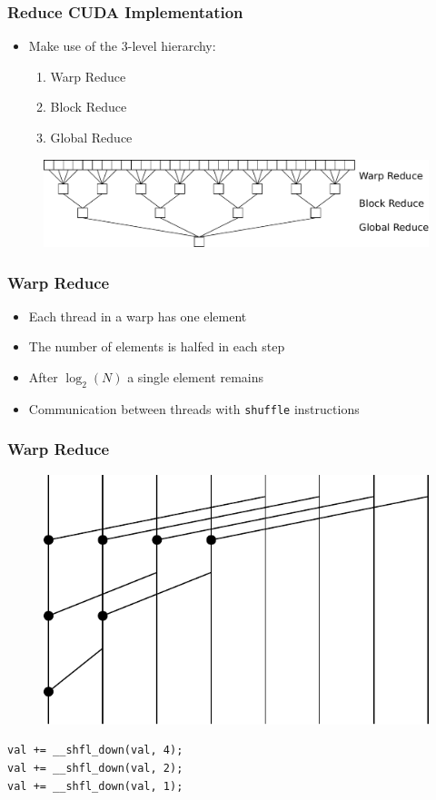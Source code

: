 \documentclass[aspectratio=169,handout]{beamer}
\begin{document}
\frame
{	
	\frametitle{Reduce CUDA Implementation}
	\begin{itemize}
		\item Make use of the 3-level hierarchy:
		\begin{enumerate}
			\item Warp Reduce
			\item Block Reduce
			\item Global Reduce
		\end{enumerate}	
	\end{itemize}
\begin{figure}
	\centering
	\includegraphics[height=0.3\textheight]{reduce}
\end{figure}
}


\frame
{	
	\frametitle{Warp Reduce}
	\begin{itemize}
		\item Each thread in a warp has one element
		\item The number of elements is halfed in each step
		\item After $\log_2(N)$ a single element remains
		\item Communication between threads with \texttt{shuffle} instructions
	\end{itemize}
}


\begin{frame}[fragile]
\frametitle{Warp Reduce}
\begin{figure}
	\includegraphics[height=0.5\textheight]{warpreduce}
\end{figure}
\begin{lstlisting}
val += __shfl_down(val, 4);
val += __shfl_down(val, 2);
val += __shfl_down(val, 1);
\end{lstlisting}

\end{frame}
\end{document}
